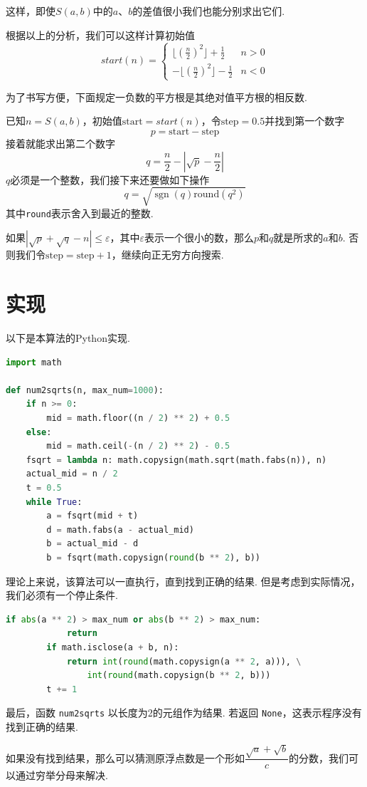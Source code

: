 \documentclass[a4paper, UTF8]{ctexart}
\DeclareMathOperator{\sgn}{\mathrm{sgn}}
\begin{document}
这样，即使$S(a,b)$中的$a$、$b$的差值很小我们也能分别求出它们.

根据以上的分析，我们可以这样计算初始值
\[
    start(n)=
    \begin{cases}
        \lfloor(\frac{n}{2})^2\rfloor+\frac{1}{2}  &n>0 \\
        -\lfloor(\frac{n}{2})^2\rfloor-\frac{1}{2} &n<0
    \end{cases}
\]

为了书写方便，下面规定一负数的平方根是其绝对值平方根的相反数.

已知$n=S(a,b)$，初始值$\text{start}=start(n)$，令$\text{step}=0.5$并找到第一个数字\[p=\text{start}-\text{step}\]接着就能求出第二个数字\[q=\frac{n}{2}-|\sqrt{p}-\frac{n}{2}|\]$q$必须是一个整数，我们接下来还要做如下操作\[q=\sqrt{\sgn(q)\mathrm{round}(q^2)}\]其中\verb|round|表示舍入到最近的整数.

如果$|\sqrt{p}+\sqrt{q}-n|\leq\varepsilon$，其中$\varepsilon$表示一个很小的数，那么$p$和$q$就是所求的$a$和$b$. 否则我们令$\text{step}=\text{step}+1$，继续向正无穷方向搜索.

\section{实现}
以下是本算法的Python实现.

\begin{lstlisting}[language=python, name=example1]
import math

def num2sqrts(n, max_num=1000):
    if n >= 0:
        mid = math.floor((n / 2) ** 2) + 0.5
    else:
        mid = math.ceil(-(n / 2) ** 2) - 0.5
    fsqrt = lambda n: math.copysign(math.sqrt(math.fabs(n)), n)
    actual_mid = n / 2
    t = 0.5
    while True:
        a = fsqrt(mid + t)
        d = math.fabs(a - actual_mid)
        b = actual_mid - d
        b = fsqrt(math.copysign(round(b ** 2), b))
\end{lstlisting}
理论上来说，该算法可以一直执行，直到找到正确的结果. 但是考虑到实际情况，我们必须有一个停止条件.
\begin{lstlisting}[language=python, name=example1]
        if abs(a ** 2) > max_num or abs(b ** 2) > max_num:
            return
        if math.isclose(a + b, n):
            return int(round(math.copysign(a ** 2, a))), \
                int(round(math.copysign(b ** 2, b)))
        t += 1
\end{lstlisting}
最后，函数 \verb|num2sqrts| 以长度为2的元组作为结果. 若返回 \verb|None|，这表示程序没有找到正确的结果.

如果没有找到结果，那么可以猜测原浮点数是一个形如$\dfrac{\sqrt{a}+\sqrt{b}}{c}$的分数，我们可以通过穷举分母来解决.
\end{document}
